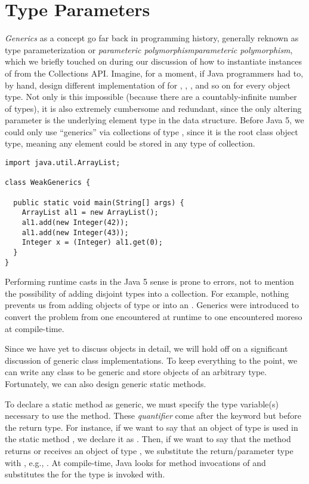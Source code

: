 \section{Type Parameters}

\emph{Generics} as a concept go far back in programming history, generally reknown as type parameterization or \emph{parameteric polymorphism}\emph{parameteric polymorphism}, which we briefly touched on during our discussion of how to instantiate instances of  from the Collections API. 
Imagine, for a moment, if Java programmers had to, by hand, design different implementation of  for , , , and so on for every object type. 
Not only is this impossible (because there are a countably-infinite number of types), it is also extremely cumbersome and redundant, since the only altering parameter is the underlying element type in the data structure. 
Before Java 5, we could only use ``generics'' via collections of type , since it is the root class object type, meaning any element could be stored in any type of collection.

\begin{lstlisting}[language=MyJava]
import java.util.ArrayList;

class WeakGenerics {

  public static void main(String[] args) {
    ArrayList al1 = new ArrayList();
    al1.add(new Integer(42));
    al1.add(new Integer(43));
    Integer x = (Integer) al1.get(0);
  }
}
\end{lstlisting}

Performing runtime casts in the Java 5 sense is prone to errors, not to mention the possibility of adding disjoint types into a collection. 
For example, nothing prevents us from adding objects of type  or  into an . 
Generics were introduced to convert the problem from one encountered at runtime to one encountered moreso at compile-time. 

Since we have yet to discuss objects in detail, we will hold off on a significant discussion of generic class implementations. 
To keep everything to the point, we can write any class to be generic and store objects of an arbitrary type. 
Fortunately, we can also design generic static methods. 

To declare a static method as generic, we must specify the type variable(s) necessary to use the method. 
These \emph{quantifier} come after the  keyword but before the return type. 
For instance, if we want to say that an object of type  is used in the static method , we declare it as . 
Then, if we want to say that the method returns or receives an object of type , we substitute the return/parameter type with , e.g., . 
At compile-time, Java looks for method invocations of  and substitutes the  for the type  is invoked with. 


